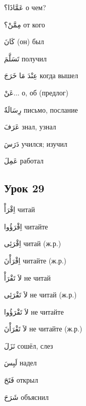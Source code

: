 \documentclass[a5paper]{article}
\newcommand\textstyleDropCaps[1]{#1}
\newcommand\textstyleCaptioncharacters[1]{#1}
\begin{document}
\textstyleCaptioncharacters{عَمَّاذَا؟ }\textstyleDropCaps{о чем?‎}

\textstyleCaptioncharacters{مِمَّنْ؟ }\textstyleDropCaps{от кого‎}

\textstyleCaptioncharacters{كَانَ }\textstyleDropCaps{(он) был‎}

\textstyleCaptioncharacters{تَسَلَّمَ }\textstyleDropCaps{получил‎}

\textstyleCaptioncharacters{عِنْدَ مَا خَرَجَ }\textstyleDropCaps{когда вы­шел‎}

\textstyleCaptioncharacters{عَنْ... }\textstyleDropCaps{о, об (предлог)‎}

\textstyleCaptioncharacters{رِسَالَةٌ }\textstyleDropCaps{письмо, послание‎}

\textstyleCaptioncharacters{عَرَفَ }\textstyleDropCaps{знал, узнал‎}

\textstyleCaptioncharacters{دَرَسَ }\textstyleDropCaps{учился; изучил‎}

\textstyleCaptioncharacters{عَمِلَ }\textstyleDropCaps{работал‎}

\subsection[Урок 29‎]{\textstyleDropCaps{Урок 29‎}}
\textstyleCaptioncharacters{اِقْرَأْ }\textstyleDropCaps{читай ‎}

\textstyleCaptioncharacters{اِقْرَؤُوا }\textstyleDropCaps{читайте‎}

\textstyleCaptioncharacters{اِقْرَئِى }\textstyleDropCaps{читай (ж.р.)‎}

\textstyleCaptioncharacters{اِقْرَأْنَ }\textstyleDropCaps{читайте (ж.р.)‎}

\textstyleCaptioncharacters{لاَ تَقْرَأْ }\textstyleDropCaps{не читай‎}

\textstyleCaptioncharacters{لاَ تَقْرَئِى }\textstyleDropCaps{не читай (ж.р.)‎}

\textstyleCaptioncharacters{لاَ تَقْرَؤُوا }\textstyleDropCaps{не читайте‎}

\textstyleCaptioncharacters{لاَ تَقْرَأْنَ }\textstyleDropCaps{не читайте (ж.р.)‎}

\textstyleCaptioncharacters{نَزَلَ }\textstyleDropCaps{сошёл, слез‎}

\textstyleCaptioncharacters{لَبِسَ }\textstyleDropCaps{надел‎}

\textstyleCaptioncharacters{فَتَحَ }\textstyleDropCaps{открыл‎}

\textstyleCaptioncharacters{شَرَحَ }\textstyleDropCaps{объяснил‎}
\end{document}
